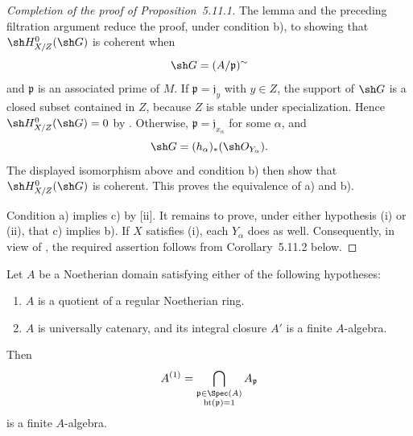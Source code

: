 \begin{proof}[Completion of the proof of Proposition~5.11.1]
The lemma and the preceding filtration argument reduce the proof,
under condition {\rm b)}, to showing that
$\sh H^0_{X/Z}(\sh G)$ is coherent when
\[
  \sh G=(A/\mathfrak p)^{\sim}
\]
and $\mathfrak p$ is an associated prime of $M$.  If
$\mathfrak p=\mathfrak j_y$ with $y\in Z$, the support of
$\sh G$ is a closed subset contained in $Z$, because $Z$ is
stable under specialization.  Hence
$\sh H^0_{X/Z}(\sh G)=0$ by .  Otherwise,
$\mathfrak p=\mathfrak j_{x_\alpha}$ for some $\alpha$, and
\[
  \sh G=(h_\alpha)_*(\sh O_{Y_\alpha}).
\]
The displayed isomorphism above and condition {\rm b)} then show
that $\sh H^0_{X/Z}(\sh G)$ is coherent.  This proves the
equivalence of {\rm a)} and {\rm b)}.

Condition {\rm a)} implies {\rm c)} by
[ii].  It remains to prove, under either
hypothesis {\rm(i)} or {\rm(ii)}, that {\rm c)} implies {\rm b)}.
If $X$ satisfies {\rm(i)}, each $Y_\alpha$ does as well.
Consequently, in view of , the required
assertion follows from Corollary~5.11.2 below.
\end{proof}

\begin{corollary}[5.11.2]
\label{IV.5.11.2}
Let $A$ be a Noetherian domain satisfying either of the following
hypotheses:
\begin{enumerate}[{\rm(i)}]
  \item $A$ is a quotient of a regular Noetherian ring.
  \item $A$ is universally catenary, and its integral closure
  $A'$ is a finite $A$-algebra.
\end{enumerate}
Then
\[
  A^{(1)}
  =\bigcap_{\substack{\mathfrak p\in\Spec(A)\\
                      \operatorname{ht}(\mathfrak p)=1}}
    A_{\mathfrak p}
\]
is a finite $A$-algebra.
\end{corollary}

